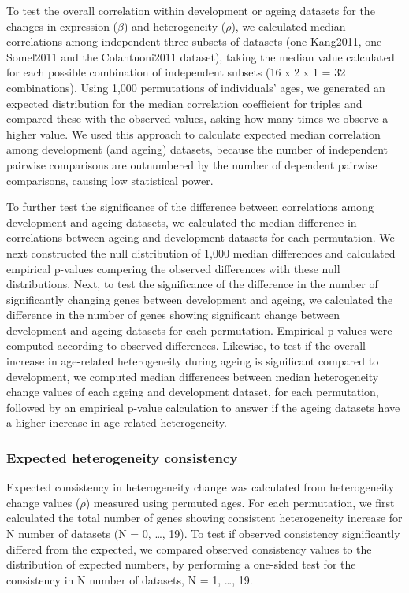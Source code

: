 \documentclass[12pt,twoside]{unicam}
\begin{document}
To test the overall correlation within development or ageing datasets for the changes in expression (\(\beta\)) and heterogeneity (\(\rho\)), we calculated median correlations among independent three subsets of datasets (one Kang2011, one Somel2011 and the Colantuoni2011 dataset), taking the median value calculated for each possible combination of independent subsets (16 x 2 x 1 = 32 combinations). Using 1,000 permutations of individuals' ages, we generated an expected distribution for the median correlation coefficient for triples and compared these with the observed values, asking how many times we observe a higher value. We used this approach to calculate expected median correlation among development (and ageing) datasets, because the number of independent pairwise comparisons are outnumbered by the number of dependent pairwise comparisons, causing low statistical power.

To further test the significance of the difference between correlations among development and ageing datasets, we calculated the median difference in correlations between ageing and development datasets for each permutation. We next constructed the null distribution of 1,000 median differences and calculated empirical p-values compering the observed differences with these null distributions. Next, to test the significance of the difference in the number of significantly changing genes between development and ageing, we calculated the difference in the number of genes showing significant change between development and ageing datasets for each permutation. Empirical p-values were computed according to observed differences. Likewise, to test if the overall increase in age-related heterogeneity during ageing is significant compared to development, we computed median differences between median heterogeneity change values of each ageing and development dataset, for each permutation, followed by an empirical p-value calculation to answer if the ageing datasets have a higher increase in age-related heterogeneity.

\hypertarget{expected-heterogeneity-consistency}{%
\subsubsection{Expected heterogeneity consistency}\label{expected-heterogeneity-consistency}}

Expected consistency in heterogeneity change was calculated from heterogeneity change values (\(\rho\)) measured using permuted ages. For each permutation, we first calculated the total number of genes showing consistent heterogeneity increase for N number of datasets (N = 0, \ldots, 19). To test if observed consistency significantly differed from the expected, we compared observed consistency values to the distribution of expected numbers, by performing a one-sided test for the consistency in N number of datasets, N = 1, \ldots, 19.
\end{document}
